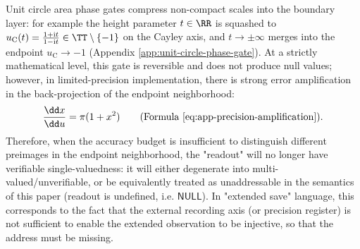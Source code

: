 \begin{remark}\label{rem:xi-null-finite-precision}
Unit circle area phase gates compress non-compact scales into the boundary layer: for example the height parameter \(t\in\RR\) ​​is squashed to \(u_{\mathrm C}(t)=\frac{1+\mathrm{i}t}{1-\mathrm{i}t}\in\TT\setminus\{-1\}\) on the Cayley axis, and \(t\to\pm\infty\) merges into the endpoint \(u_{\mathrm C}\to-1\) (Appendix \ref{app:unit-circle-phase-gate}).
At a strictly mathematical level, this gate is reversible and does not produce null values; however, in limited-precision implementation, there is strong error amplification in the back-projection of the endpoint neighborhood:
\[
\frac{\dd x}{\dd u}=\pi(1+x^2)
\qquad\text{(Formula \eqref{eq:app-precision-amplification})}.
\]
Therefore, when the accuracy budget is insufficient to distinguish different preimages in the endpoint neighborhood, the "readout" will no longer have verifiable single-valuedness: it will either degenerate into multi-valued/unverifiable, or be equivalently treated as unaddressable in the semantics of this paper (readout is undefined, i.e. \(\mathsf{NULL}\)).
In "extended save" language, this corresponds to the fact that the external recording axis (or precision register) is not sufficient to enable the extended observation to be injective, so that the address must be missing.
\end{remark}




